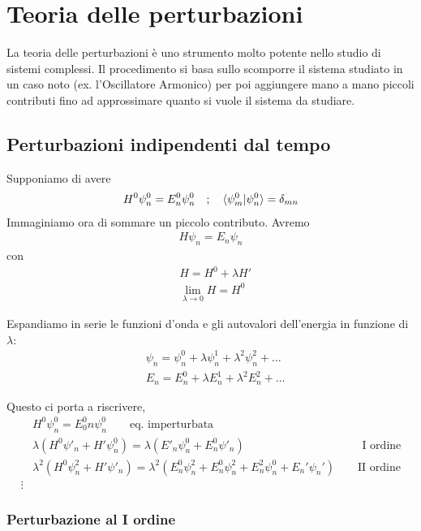 \chapter{Teoria delle perturbazioni}

La teoria delle perturbazioni è uno strumento molto potente nello studio di sistemi complessi. Il procedimento si basa sullo scomporre il sistema studiato in un caso noto (ex. l'Oscillatore Armonico) per poi aggiungere mano a mano piccoli contributi fino ad approssimare quanto si vuole il sistema da studiare.

\section{Perturbazioni indipendenti dal tempo}

Supponiamo di avere
\begin{align}
H^0\psi_n^0=E_n^0\psi_n^0 \quad ; \quad \braket{\psi_m^0|\psi_n^0}=\delta_{mn}
\end{align}
Immaginiamo ora di sommare un piccolo contributo. Avremo
\begin{align}
H\psi_n=E_n\psi_n 
\end{align}
con
\begin{align}
{}&H= H^0 + \lambda H'\\
&\lim_{\lambda \rightarrow 0}H= H^0
\end{align}

Espandiamo in serie le funzioni d'onda e gli autovalori dell'energia in funzione di $\lambda$:
\begin{align}
{}&\psi_n= \psi^0_n + \lambda \psi_n^1+ \lambda^2 \psi_n^2+\dots \\
&E_n= E_n^0 + \lambda E_n^1+ \lambda^2 E_n^2+\dots
\end{align}

Questo ci porta a riscrivere, 
\begin{align}
{}&H^0\psi^0_n=E^0_0n\psi^0_n	\qquad \text{eq. imperturbata}\\
&\lambda(H^0\psi'_n + H'\psi^0_n)=\lambda(E'_n \psi^0_n + E^0_n\psi'_n) \qquad\qquad\qquad\qquad\qquad\,\, \text{I ordine}\\
&\lambda^2 (H^0\psi^2_n + H'\psi'_n)=\lambda^2 (E^0_n \psi^2_n + E^0_n \psi_n^2 + E_n^2\psi_n^0 + E_n'\psi_n')\qquad \text{II ordine} \\
\vdots \nonumber
\end{align}

\subsection{Perturbazione al I ordine}


